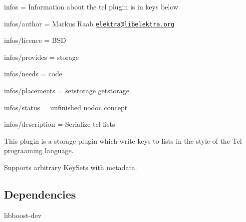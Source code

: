 
\begin{DoxyItemize}
\item infos = Information about the tcl plugin is in keys below
\item infos/author = Markus Raab \href{mailto:elektra@libelektra.org}{\tt elektra@libelektra.\+org}
\item infos/licence = B\+S\+D
\item infos/provides = storage
\item infos/needs = code
\item infos/placements = setstorage getstorage
\item infos/status = unfinished nodoc concept
\item infos/description = Serialize tcl lists
\end{DoxyItemize}

This plugin is a storage plugin which write keys to lists in the style of the Tcl prograaming language.

Supports arbitrary Key\+Sets with metadata.

\subsection*{Dependencies}


\begin{DoxyItemize}
\item {\ttfamily libboost-\/dev} 
\end{DoxyItemize}